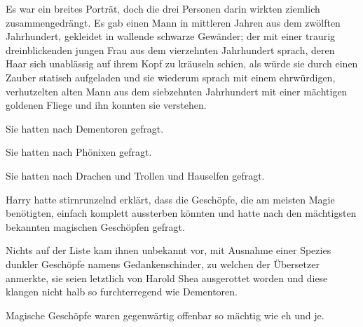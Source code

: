 Es war ein breites Porträt, doch die drei Personen darin wirkten ziemlich zusammengedrängt. Es gab einen Mann in mittleren Jahren aus dem zwölften Jahrhundert, gekleidet in wallende schwarze Gewänder; der mit einer traurig dreinblickenden jungen Frau aus dem vierzehnten Jahrhundert sprach, deren Haar sich unablässig auf ihrem Kopf zu kräuseln schien, als würde sie durch einen Zauber statisch aufgeladen und sie wiederum sprach mit einem ehrwürdigen, verhutzelten alten Mann aus dem siebzehnten Jahrhundert mit einer mächtigen goldenen Fliege und ihn konnten sie verstehen.

Sie hatten nach Dementoren gefragt.

Sie hatten nach Phönixen gefragt.

Sie hatten nach Drachen und Trollen und Hauselfen gefragt.

Harry hatte stirnrunzelnd erklärt, dass die Geschöpfe, die am meisten Magie benötigten, einfach komplett aussterben könnten und hatte nach den mächtigsten bekannten magischen Geschöpfen gefragt.

Nichts auf der Liste kam ihnen unbekannt vor, mit Ausnahme einer Spezies dunkler Geschöpfe namens Gedankenschinder, zu welchen der Übersetzer anmerkte, sie seien letztlich von Harold Shea ausgerottet worden und diese klangen nicht halb so furchterregend wie Dementoren.

Magische Geschöpfe waren gegenwärtig offenbar so mächtig wie eh und je.

